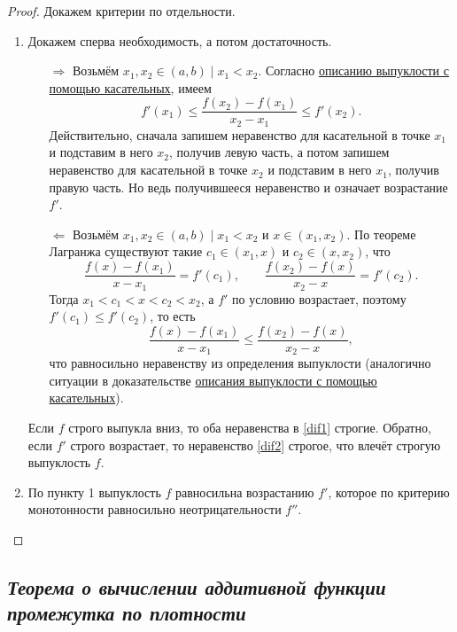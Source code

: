 \begin{proof}
	Докажем критерии по отдельности.
	\begin{enumerate}
		\item Докажем сперва необходимость, а потом достаточность.
		\begin{enumerate}
			\item[\(\Rightarrow\)] \label{dif}Возьмём \(x_1, x_2 \in (a, b) \mid x_1 < x_2\). Согласно \hyperlink{vypkas}{описанию выпуклости с помощью касательных}, имеем
			\begin{equation}
				\label{dif1}
				f'(x_1) \leqslant \frac{f(x_2) - f(x_1)}{x_2 - x_1} \leqslant f'(x_2).
			\end{equation}
			Действительно, сначала запишем неравенство для касательной в точке \(x_1\) и подставим в него \(x_2\), получив левую часть, а потом запишем неравенство для касательной в точке \(x_2\) и подставим в него \(x_1\), получив правую часть. Но ведь получившееся неравенство и означает возрастание \(f'\).
			\item[\(\Leftarrow\)] Возьмём \(x_1, x_2 \in (a, b) \mid x_1 < x_2\) и \(x \in (x_1, x_2)\). По теореме Лагранжа существуют такие \(c_1 \in (x_1, x)\) и \(c_2 \in (x, x_2)\), что \[
			\frac{f(x) - f(x_1)}{x - x_1} = f'(c_1), \qquad \frac{f(x_2) - f(x)}{x_2 - x} = f'(c_2).
			\]
			Тогда \(x_1 < c_1 < x < c_2 < x_2\), а \(f'\) по условию возрастает, поэтому \(f'(c_1) \leqslant f'(c_2)\), то есть
			\begin{equation}
				\label{dif2}
				\frac{f(x) - f(x_1)}{x - x_1} \leqslant \frac{f(x_2) - f(x)}{x_2 - x},	
			\end{equation}
			что равносильно неравенству из определения выпуклости (аналогично ситуации в доказательстве \hyperlink{vypkas}{описания выпуклости с помощью касательных}).
		\end{enumerate}
		
		Если \(f\) строго выпукла вниз, то оба неравенства в \eqref{dif1} строгие. Обратно, если \(f'\) строго возрастает, то неравенство \eqref{dif2} строгое, что влечёт строгую выпуклость \(f\).
		
		\item По пункту 1 выпуклость \(f\) равносильна возрастанию \(f'\), которое по критерию монотонности равносильно неотрицательности \(f''\).
	\end{enumerate}
\end{proof}

\subsection{\itshape Теорема о вычислении аддитивной функции промежутка по плотности}

